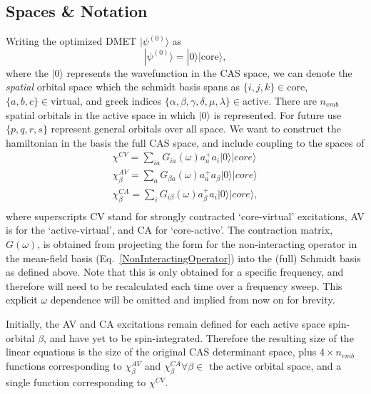 \documentclass[a4paper,oneside,11pt]{article}
\numberwithin{equation}{section}
\newcommand{\DMETKet}{|0\rangle| \mathrm{core} \rangle}
\begin{document}
\subsection{Spaces \& Notation}

Writing the optimized DMET $|\psi^{(0)} \rangle$ as
\begin{equation}
|\psi^{(0)} \rangle = \DMETKet ,
\end{equation}
where the $|0 \rangle$ represents the wavefunction in the CAS space, we can denote the {\em spatial} orbital space which the schmidt basis spans 
as $\{i,j,k\} \in \textrm{core}$, $\{a,b,c\} \in \textrm{virtual}$, and greek indices $\{ \alpha,\beta,\gamma,\delta,\mu,\lambda \} \in \textrm{active}$. There are $n_{emb}$ spatial 
orbitals in the active space in which $|0 \rangle$ is represented. For future use $\{p,q,r,s\}$ represent general orbitals over all space.
We want to construct the hamiltonian in the basis the full CAS space, and include coupling to the spaces of
\begin{eqnarray}
\chi^{CV} = \sum_{ia} G_{ia}(\omega) a_a^{+} a_i |0\rangle |core\rangle \\
\chi^{AV}_{\beta} = \sum_{a} G_{\beta a}(\omega) a_a^{+} a_{\beta} |0\rangle |core\rangle \\
\chi^{CA}_{\beta} = \sum_{i} G_{i \beta}(\omega) a_{\beta}^{+} a_{i} |0\rangle |core\rangle , \\
\end{eqnarray}
where superscripts CV stand for strongly contracted `core-virtual' excitations, AV is for the `active-virtual', and CA for `core-active'. The contraction matrix, $G(\omega)$, is obtained from projecting the
form for the non-interacting operator in the mean-field basis (Eq.~\ref{NonInteractingOperator}) into the (full) Schmidt basis as defined above. Note that this is only obtained for a specific
frequency, and therefore will need to be recalculated each time over a frequency sweep. This explicit $\omega$ dependence will be omitted and implied from now on for brevity. 

Initially, the AV and CA excitations remain defined for
each active space spin-orbital $\beta$, and have yet to be spin-integrated. Therefore the resulting size of the linear equations is the size of the original CAS determinant space, plus $4 \times n_{emb}$
functions corresponding to $\chi^{AV}_{\beta}$ and $\chi^{CA}_{\beta} \forall \beta \in$ the active orbital space, and a single function corresponding to $\chi^{CV}$.
\end{document}
